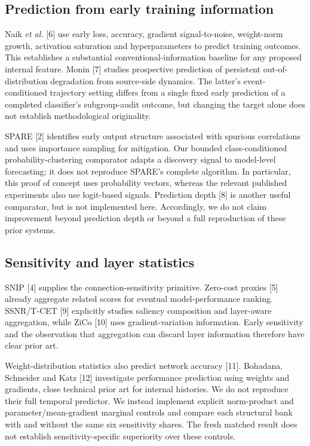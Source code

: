 \subsection{Prediction from early training information}
Naik \emph{et al.} [6] use early loss, accuracy, gradient signal-to-noise, weight-norm growth, activation saturation and hyperparameters to predict training outcomes. This establishes a substantial conventional-information baseline for any proposed internal feature. Monin [7] studies prospective prediction of persistent out-of-distribution degradation from source-side dynamics. The latter's event-conditioned trajectory setting differs from a single fixed early prediction of a completed classifier's subgroup-audit outcome, but changing the target alone does not establish methodological originality.

SPARE [2] identifies early output structure associated with spurious correlations and uses importance sampling for mitigation. Our bounded class-conditioned probability-clustering comparator adapts a discovery signal to model-level forecasting; it does not reproduce SPARE's complete algorithm. In particular, this proof of concept uses probability vectors, whereas the relevant published experiments also use logit-based signals. Prediction depth [8] is another useful comparator, but is not implemented here. Accordingly, we do not claim improvement beyond prediction depth or beyond a full reproduction of these prior systems.

\subsection{Sensitivity and layer statistics}
SNIP [4] supplies the connection-sensitivity primitive. Zero-cost proxies [5] already aggregate related scores for eventual model-performance ranking. SSNR/T-CET [9] explicitly studies saliency composition and layer-aware aggregation, while ZiCo [10] uses gradient-variation information. Early sensitivity and the observation that aggregation can discard layer information therefore have clear prior art.

Weight-distribution statistics also predict network accuracy [11]. Bohadana, Schneider and Katz [12] investigate performance prediction using weights and gradients, close technical prior art for internal histories. We do not reproduce their full temporal predictor. We instead implement explicit norm-product and parameter/mean-gradient marginal controls and compare each structural bank with and without the same six sensitivity shares. The fresh matched result does not establish sensitivity-specific superiority over these controls.

